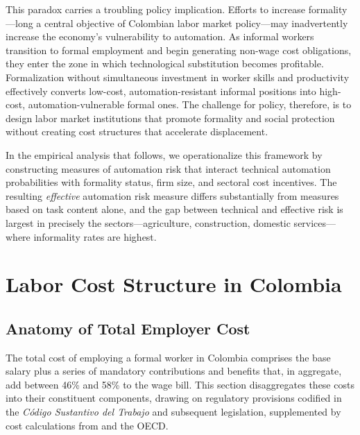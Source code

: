 This paradox carries a troubling policy implication. Efforts to increase formality---long a central objective of Colombian labor market policy---may inadvertently increase the economy's vulnerability to automation. As informal workers transition to formal employment and begin generating non-wage cost obligations, they enter the zone in which technological substitution becomes profitable. Formalization without simultaneous investment in worker skills and productivity effectively converts low-cost, automation-resistant informal positions into high-cost, automation-vulnerable formal ones. The challenge for policy, therefore, is to design labor market institutions that promote formality and social protection without creating cost structures that accelerate displacement.

In the empirical analysis that follows, we operationalize this framework by constructing measures of automation risk that interact technical automation probabilities with formality status, firm size, and sectoral cost incentives. The resulting \textit{effective} automation risk measure differs substantially from measures based on task content alone, and the gap between technical and effective risk is largest in precisely the sectors---agriculture, construction, domestic services---where informality rates are highest.


\section{Labor Cost Structure in Colombia}
\label{sec:labor_costs}

\subsection{Anatomy of Total Employer Cost}
\label{subsec:cost_anatomy}

The total cost of employing a formal worker in Colombia comprises the base salary plus a series of mandatory contributions and benefits that, in aggregate, add between 46\% and 58\% to the wage bill. This section disaggregates these costs into their constituent components, drawing on regulatory provisions codified in the \textit{C\'odigo Sustantivo del Trabajo} and subsequent legislation, supplemented by cost calculations from \cite{anif2018} and the OECD.

